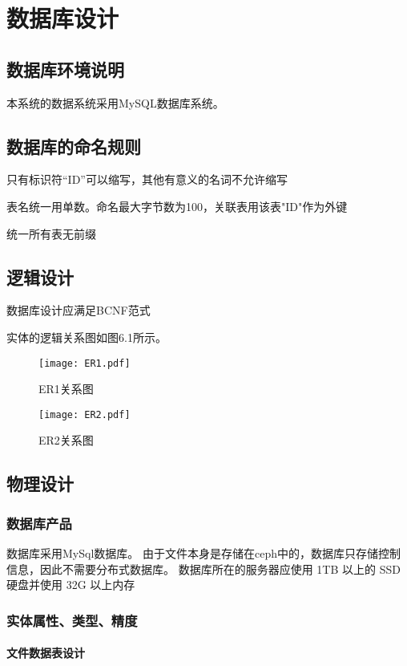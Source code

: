 \chapter{数据库设计}
\section{数据库环境说明}
本系统的数据系统采用MySQL数据库系统。

\section{数据库的命名规则}
只有标识符“ID”可以缩写，其他有意义的名词不允许缩写

表名统一用单数。命名最大字节数为100，关联表用该表"ID"作为外键

统一所有表无前缀

\section{逻辑设计}
数据库设计应满足BCNF范式

实体的逻辑关系图如图6.1所示。
\begin{figure}
    \centering
    \texttt{[image: ER1.pdf]}
    \caption{ER1关系图}\label{fig:noted-figure}
\end{figure}

\begin{figure}
    \centering
    \texttt{[image: ER2.pdf]}
    \caption{ER2关系图}\label{fig:noted-figure}
\end{figure}

\section{物理设计}
\subsection{数据库产品}
数据库采用MySql数据库。
由于文件本身是存储在ceph中的，数据库只存储控制信息，因此不需要分布式数据库。
数据库所在的服务器应使用 1TB 以上的 SSD 硬盘并使用 32G 以上内存

\subsection{实体属性、类型、精度}
\subsubsection{文件数据表设计}


